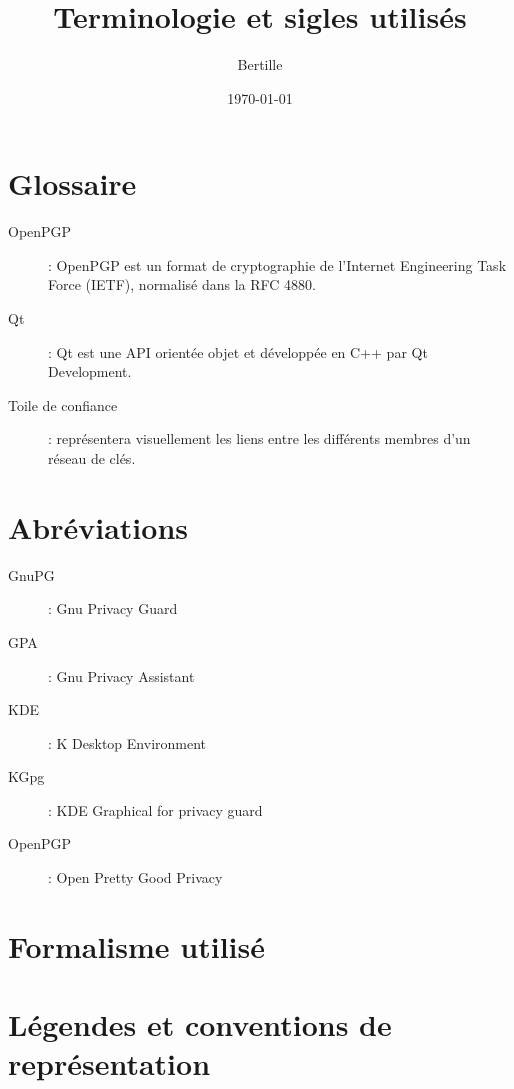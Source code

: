 \documentclass{../res/univ-projet}
\title{Terminologie et sigles utilisés}
\author{Bertille \bsc{Bouillie}}
\date{\today}
\begin{document}
\maketitle
\newpage
\tableofcontents
\newpage


\section{Glossaire}

\begin{description}
 \item[OpenPGP] : OpenPGP est un format de cryptographie de l'Internet Engineering Task Force (IETF), normalisé dans la RFC 4880.\\
 \item[Qt] : Qt est une API orientée objet et développée en C++ par Qt Development.\\
 \item[Toile de confiance] : représentera visuellement les liens entre les différents membres d'un réseau de clés.\\
\end{description}



\section{Abréviations}

\begin{description}
 \item[GnuPG] : Gnu Privacy Guard\\
 \item[GPA] : Gnu Privacy Assistant\\
 \item[KDE] : K Desktop Environment\\
 \item[KGpg] : KDE Graphical for privacy guard\\
 \item[OpenPGP] : Open Pretty Good Privacy\\
\end{description}



\section{Formalisme utilisé}

\begin{description}
 \item 
\end{description}



\section{Légendes et conventions de représentation}

\begin{description}
 \item 
\end{description}
\end{document}

